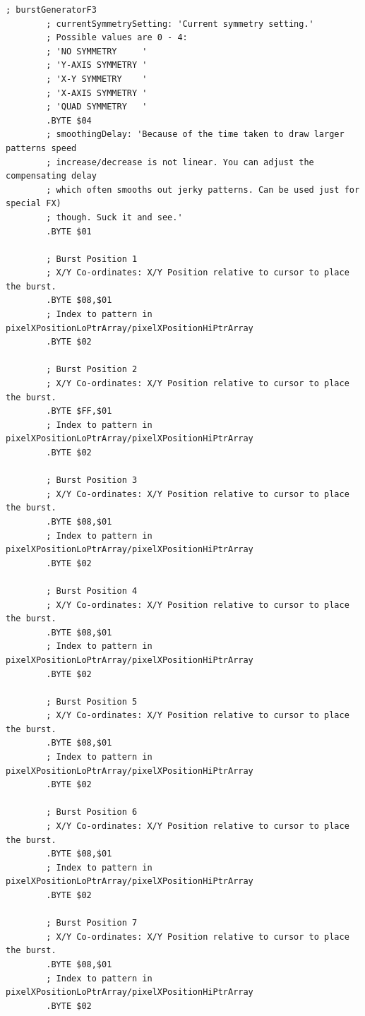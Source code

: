 \begin{lstlisting}[basicstyle=\tiny,caption=Source code for the F3 Burst.]
; burstGeneratorF3
        ; currentSymmetrySetting: 'Current symmetry setting.'
        ; Possible values are 0 - 4:
        ; 'NO SYMMETRY     '
        ; 'Y-AXIS SYMMETRY '
        ; 'X-Y SYMMETRY    '
        ; 'X-AXIS SYMMETRY '
        ; 'QUAD SYMMETRY   '
        .BYTE $04
        ; smoothingDelay: 'Because of the time taken to draw larger patterns speed
        ; increase/decrease is not linear. You can adjust the compensating delay
        ; which often smooths out jerky patterns. Can be used just for special FX)
        ; though. Suck it and see.'
        .BYTE $01

        ; Burst Position 1  
        ; X/Y Co-ordinates: X/Y Position relative to cursor to place the burst.
        .BYTE $08,$01
        ; Index to pattern in pixelXPositionLoPtrArray/pixelXPositionHiPtrArray
        .BYTE $02

        ; Burst Position 2
        ; X/Y Co-ordinates: X/Y Position relative to cursor to place the burst.
        .BYTE $FF,$01
        ; Index to pattern in pixelXPositionLoPtrArray/pixelXPositionHiPtrArray
        .BYTE $02

        ; Burst Position 3
        ; X/Y Co-ordinates: X/Y Position relative to cursor to place the burst.
        .BYTE $08,$01
        ; Index to pattern in pixelXPositionLoPtrArray/pixelXPositionHiPtrArray
        .BYTE $02

        ; Burst Position 4
        ; X/Y Co-ordinates: X/Y Position relative to cursor to place the burst.
        .BYTE $08,$01
        ; Index to pattern in pixelXPositionLoPtrArray/pixelXPositionHiPtrArray
        .BYTE $02

        ; Burst Position 5
        ; X/Y Co-ordinates: X/Y Position relative to cursor to place the burst.
        .BYTE $08,$01
        ; Index to pattern in pixelXPositionLoPtrArray/pixelXPositionHiPtrArray
        .BYTE $02

        ; Burst Position 6
        ; X/Y Co-ordinates: X/Y Position relative to cursor to place the burst.
        .BYTE $08,$01
        ; Index to pattern in pixelXPositionLoPtrArray/pixelXPositionHiPtrArray
        .BYTE $02

        ; Burst Position 7
        ; X/Y Co-ordinates: X/Y Position relative to cursor to place the burst.
        .BYTE $08,$01
        ; Index to pattern in pixelXPositionLoPtrArray/pixelXPositionHiPtrArray
        .BYTE $02


\end{lstlisting}
